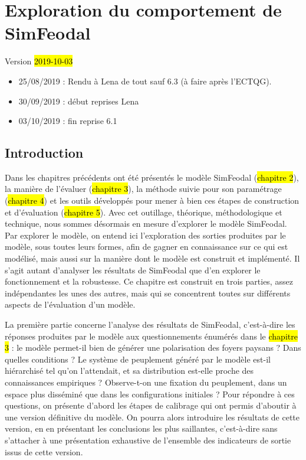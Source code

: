 \chapter{Exploration du comportement de SimFeodal}
\label{chap:chap6}
\begin{center}
	{\large Version \hl{2019-10-03}}
\end{center}

\begin{itemize}
	\item 25/08/2019 : Rendu à Lena de tout sauf 6.3 (à faire après l'ECTQG).
	\item 30/09/2019 : début reprises Lena
	\item 03/10/2019 : fin reprise 6.1
\end{itemize} 

\minitoc

\clearpage
\section*{Introduction}

Dans les chapitres précédents ont été présentés le modèle SimFeodal (\hl{chapitre 2}), la manière de l'évaluer (\hl{chapitre 3}), la méthode suivie pour son paramétrage (\hl{chapitre 4}) et les outils développés pour mener à bien ces étapes de construction et d'évaluation (\hl{chapitre 5}).
Avec cet outillage, théorique, méthodologique et technique, nous sommes désormais en mesure d'explorer le modèle SimFeodal.
Par \og explorer le modèle\fg{}, on entend ici l'exploration des sorties produites par le modèle, sous toutes leurs formes, afin de gagner en connaissance sur ce qui est modélisé, mais aussi sur la manière dont le modèle est construit et implémenté.
Il s'agit autant d'analyser les \og résultats\fg{} de SimFeodal que d'en explorer le fonctionnement et la robustesse.
Ce chapitre est construit en trois parties, assez indépendantes les unes des autres, mais qui se concentrent toutes sur différents aspects de l'évaluation d'un modèle.

La première partie concerne l'analyse des \og résultats\fg{} de SimFeodal, c'est-à-dire les réponses produites par le modèle aux questionnements énumérés dans le \hl{chapitre 3} :
le modèle permet-il bien de générer une polarisation des foyers paysans ? Dans quelles conditions ?
Le système de peuplement généré par le modèle est-il hiérarchisé tel qu'on l'attendait, et sa distribution est-elle proche des connaissances empiriques ?
Observe-t-on une fixation du peuplement, dans un espace plus disséminé que dans les configurations initiales ?
Pour répondre à ces questions, on présente d'abord les étapes de calibrage qui ont permis d'aboutir à une version \og définitive\fg{} du modèle.
On pourra alors introduire les résultats de cette version, en en présentant les conclusions les plus saillantes, c'est-à-dire sans s'attacher à une présentation exhaustive de l'ensemble des indicateurs de sortie issus de cette version.

